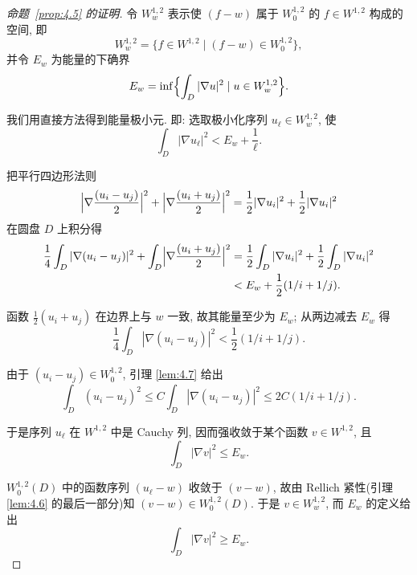\begin{proof}[命题~\ref{prop:4.5} 的证明]
令 $W_w^{1,2}$ 表示使 $(f-w)$ 属于 $W_0^{1,2}$ 的 $f\in W^{1,2}$ 构成的
空间, 即
\begin{equation*}
W_w^{1,2}=\bigl\{f\in W^{1,2}\mid(f-w)\in W_0^{1,2}\bigr\},
\end{equation*}
并令 $E_w$ 为能量的下确界
\begin{equation*}
E_w=\inf\Bigl\{\int_D|\nabla u|^2\mid u\in W_w^{1,2}\Bigr\}.
\end{equation*}

我们用直接方法得到能量极小元. 即: 选取极小化序列
$u_\ell\in W_w^{1,2}$, 使
\begin{equation}
\int_D|\nabla u_\ell|^2<E_w+\frac1\ell.
\label{eq:4.19}
\end{equation}

把平行四边形法则
\begin{equation*}
\Bigl|\nabla\frac{(u_i-u_j)}{2}\Bigr|^2
 +\Bigl|\nabla\frac{(u_i+u_j)}{2}\Bigr|^2
 =\frac12|\nabla u_i|^2+\frac12|\nabla u_i|^2
\end{equation*}
在圆盘 $D$ 上积分得
\begin{equation}
\begin{aligned}
\frac14\int_D|\nabla(u_i-u_j)|^2
 +\int_D\Bigl|\nabla\frac{(u_i+u_j)}{2}\Bigr|^2
&=\frac12\int_D|\nabla u_i|^2+\frac12\int_D|\nabla u_i|^2\\
&<E_w+\frac12(1/i+1/j).
\end{aligned}
\label{eq:4.20}
\end{equation}

函数 $\frac12(u_i+u_j)$ 在边界上与 $w$ 一致, 故其能量至少为 $E_w$;
从两边减去 $E_w$ 得
\begin{equation*}
\frac14\int_D|\nabla(u_i-u_j)|^2<\frac12(1/i+1/j).
\end{equation*}

由于 $(u_i-u_j)\in W_0^{1,2}$, 引理 \ref{lem:4.7} 给出
\begin{equation}
\int_D(u_i-u_j)^2\leq C\int_D|\nabla(u_i-u_j)|^2
 \leq 2C(1/i+1/j).
\label{eq:4.21}
\end{equation}

于是序列 $u_\ell$ 在 $W^{1,2}$ 中是 Cauchy 列, 因而强收敛于某个函数
$v\in W^{1,2}$, 且
\begin{equation*}
\int_D|\nabla v|^2\leq E_w.
\end{equation*}

$W_0^{1,2}(D)$ 中的函数序列 $(u_\ell-w)$ 收敛于 $(v-w)$, 故由 Rellich
紧性(引理 \ref{lem:4.6} 的最后一部分)知 $(v-w)\in W_0^{1,2}(D)$. 于是
$v\in W_w^{1,2}$, 而 $E_w$ 的定义给出
\begin{equation*}
\int_D|\nabla v|^2\geq E_w.
\end{equation*}


\end{proof}
